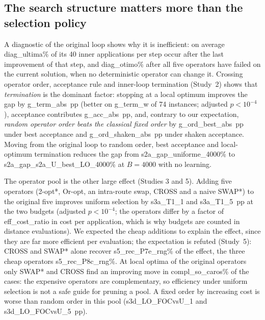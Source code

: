 \subsection{The search structure matters more than the selection policy}\label{sec:r2}
A diagnostic of the original loop shows why it is inefficient: on average \num{diag_ultima}\% of its 40 inner applications per step occur after the last improvement of that step, and \num{diag_otimo}\% after all five operators have failed on the current solution, when no deterministic operator can change it. Crossing operator order, acceptance rule and inner-loop termination (Study~2) shows that \emph{termination} is the dominant factor: stopping at a local optimum improves the gap by \num{g_term_abs}~pp (better on \num{g_term_w} of 74 instances; adjusted $p<10^{-4}$), acceptance contributes \num{g_acc_abs}~pp, and, contrary to our expectation, \emph{random operator order beats the classical fixed order} by \num{g_ord_best_abs}~pp under best acceptance and \num{g_ord_shaken_abs}~pp under shaken acceptance. Moving from the original loop to random order, best acceptance and local-optimum termination reduces the gap from \num{s2a_gap_uniforme_4000}\% to \num{s2a_gap_s2a_U_best_LO_4000}\% at $B=4000$ with no learning.

The operator pool is the other large effect (Studies 3 and 5). Adding five operators (2-opt*, Or-opt, an intra-route swap, CROSS and a naive SWAP*) to the original five improves uniform selection by \num{s3a_T1_1} and \num{s3a_T1_5}~pp at the two budgets (adjusted $p<10^{-4}$; the operators differ by a factor of \num{eff_cost_ratio} in cost per application, which is why budgets are counted in distance evaluations). We expected the cheap additions to explain the effect, since they are far more efficient per evaluation; the expectation is refuted (Study~5): CROSS and SWAP* alone recover \num{s5_rec_P7e_rng}\% of the effect, the three cheap operators \num{s5_rec_P8c_rng}\%. At local optima of the original operators only SWAP* and CROSS find an improving move in \num{compl_so_caros}\% of the cases: the expensive operators are complementary, so efficiency under uniform selection is not a safe guide for pruning a pool. A fixed order by increasing cost is worse than random order in this pool (\num{s3d_LO_FOCvsU_1} and \num{s3d_LO_FOCvsU_5}~pp).


